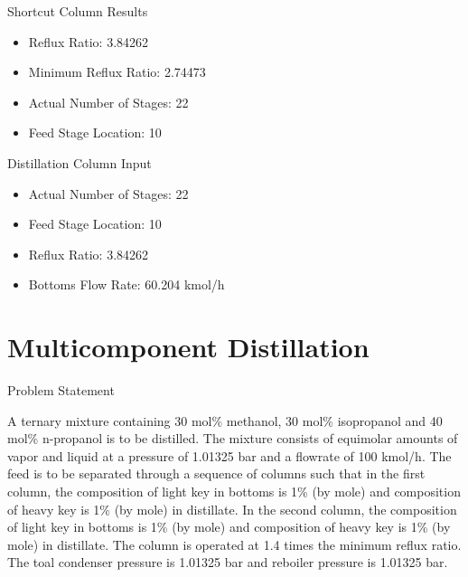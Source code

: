 \documentclass[10pt]{beamer}
\begin{document}
\begin{frame}{Shortcut Column Results}
	\begin{itemize}
		\item Reflux Ratio: 3.84262
		\item Minimum Reflux Ratio: 2.74473
		\item Actual Number of Stages: 22
		\item Feed Stage Location: 10
	\end{itemize}
\end{frame}


\begin{frame}{Distillation Column Input}
	\begin{itemize}
		\item Actual Number of Stages: 22
		\item Feed Stage Location: 10
		\item Reflux Ratio: 3.84262
		\item Bottoms Flow Rate: 60.204 kmol/h
	\end{itemize}
\end{frame}

\section{Multicomponent Distillation}
	\begin{frame}{Problem Statement}
		
			A ternary mixture containing 30 mol\% methanol, 30 mol\% isopropanol and 40 mol\% n-propanol is to be distilled. The mixture consists of equimolar amounts of vapor and liquid at a pressure of 1.01325 bar and a flowrate of 100 kmol/h. The feed is to be separated through a sequence of columns such that in the first column, the composition of light key in bottoms is 1\% (by mole) and composition of heavy key is 1\% (by mole) in distillate. In the second column, the composition of light key in bottoms is 1\% (by mole) and composition of heavy key is 1\% (by mole) in distillate. The column is operated at 1.4 times the minimum reflux ratio. The toal condenser pressure is 1.01325 bar and reboiler pressure is 1.01325 bar.
		
	\end{frame}
\end{document}
